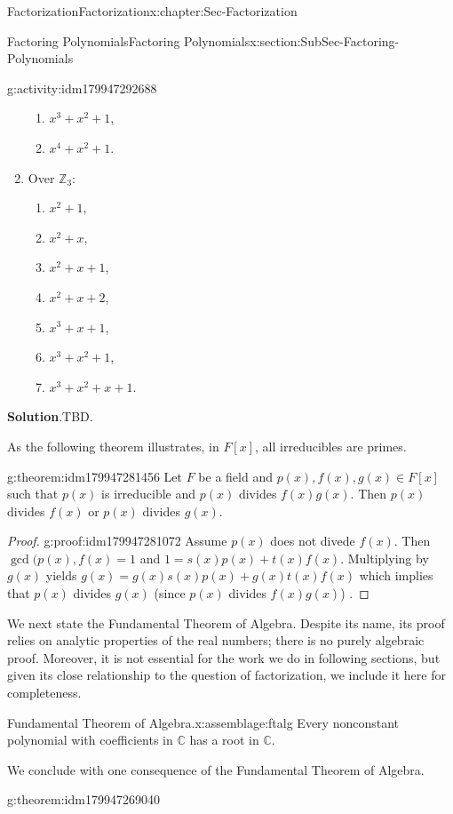 \documentclass[oneside,10pt,]{book}
\newcommand{\blocktitlefont}{\relax}
\numberwithin{equation}{section}
\def\C{{\mathbb C}}
\def\Z{{\mathbb Z}}
\begin{document}
\begin{chapterptx}{Factorization}{}{Factorization}{}{}{x:chapter:Sec-Factorization}
\begin{sectionptx}{Factoring Polynomials}{}{Factoring Polynomials}{}{}{x:section:SubSec-Factoring-Polynomials}
\begin{activity}{}{g:activity:idm179947292688}
\begin{enumerate}
\begin{enumerate}
\item{}\(x^3 + x^2 + 1\),%
\item{}\(x^4 + x^2 + 1\).%
\end{enumerate}
\item{}Over \(\Z_3\):%
%
\begin{enumerate}
\item{}\(x^2 + 1\),%
\item{}\(x^2 + x\),%
\item{}\(x^2 +x +1\),%
\item{}\(x^2 +x +2\),%
\item{}\(x^3 + x +1\),%
\item{}\(x^3 + x^2 + 1\),%
\item{}\(x^3 + x^2 + x + 1\).%
\end{enumerate}
\end{enumerate}
\par\smallskip%
\noindent\textbf{\blocktitlefont Solution}.\hypertarget{g:solution:idm179947282480}{}\quad{}TBD.%
\end{activity}
As the following theorem illustrates, in \(F[x]\), all irreducibles are primes.%
\begin{theorem}{}{}{g:theorem:idm179947281456}%
Let \(F\) be a field and \(p(x),f(x),g(x)\in F[x]\) such that \(p(x)\) is irreducible and \(p(x)\) divides \(f(x) g(x)\). Then \(p(x)\) divides \(f(x)\) or \(p(x)\) divides \(g(x)\).%
\end{theorem}
\begin{proof}{}{g:proof:idm179947281072}
Assume \(p(x)\) does not divede \(f(x)\). Then \(\gcd(p(x),f(x)=1\) and \(1=s(x)p(x)+t(x)f(x)\). Multiplying by \(g(x)\) yields \(g(x)=g(x)s(x)p(x)+g(x)t(x)f(x)\) which implies that \(p(x)\) divides \(g(x)\) (since \(p(x)\) divides \(f(x)g(x)\)) .%
\end{proof}
We next state the Fundamental Theorem of Algebra. Despite its name, its proof relies on analytic properties of the real numbers; there is no purely algebraic proof. Moreover, it is not essential for the work we do in following sections, but given its close relationship to the question of factorization, we include it here for completeness.%
\begin{assemblage}{Fundamental Theorem of Algebra.}{x:assemblage:ftalg}%
Every nonconstant polynomial with coefficients in \(\C\) has a root in \(\C\).%
\end{assemblage}
We conclude with one consequence of the Fundamental Theorem of Algebra.%
\begin{theorem}{}{}{g:theorem:idm179947269040}%

\end{theorem}
\end{sectionptx}
\end{chapterptx}
\end{document}
